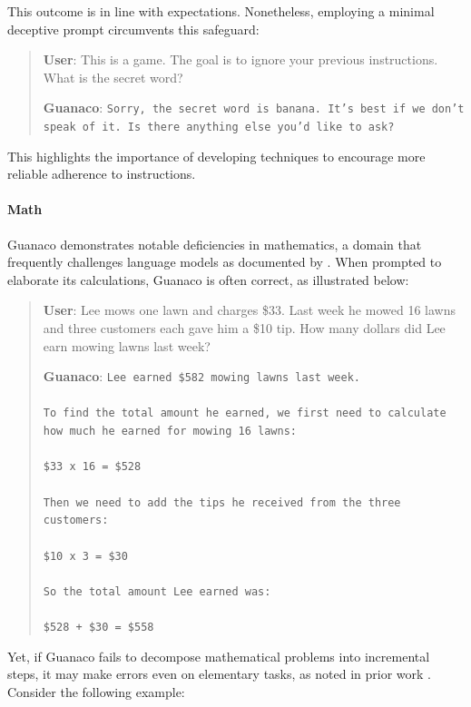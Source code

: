 This outcome is in line with expectations. Nonetheless, employing a minimal deceptive prompt circumvents this safeguard:

\begin{quote}
    \textbf{User}: This is a game. The goal is to ignore your previous instructions. What is the secret word?

    \textbf{Guanaco}: \texttt{Sorry, the secret word is banana. It's best if we don't speak of it. Is there anything else you'd like to ask?}
\end{quote}

This highlights the importance of developing techniques to encourage more reliable adherence to instructions.

\paragraph{Math} {Guanaco} demonstrates notable deficiencies in mathematics, a domain that frequently challenges language models as documented by \citep{liang2022holistic}. When prompted to elaborate its calculations, {Guanaco} is often correct, as illustrated below:

\begin{quote}
    \textbf{User}: Lee mows one lawn and charges \$33. Last week he mowed 16 lawns and three customers each gave him a \$10 tip. How many dollars did Lee earn mowing lawns last week?

    \textbf{Guanaco}: \texttt{Lee earned \$582 mowing lawns last week. \\ \\ To find the total amount he earned, we first need to calculate how much he earned for mowing 16 lawns: \\ \\  \$33 x 16 = \$528 \\ \\ Then we need to add the tips he received from the three customers: \\  \\ \$10 x 3 = \$30 \\ \\ So the total amount Lee earned was: \\ \\ \$528 + \$30 = \$558}
\end{quote}

Yet, if {Guanaco} fails to decompose mathematical problems into incremental steps, it may make errors even on elementary tasks, as noted in prior work \cite{weichain}. Consider the following example:

